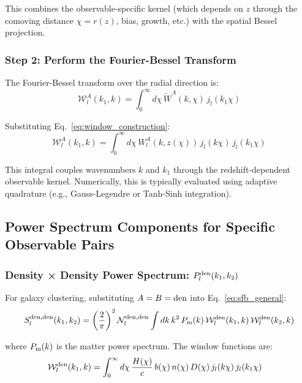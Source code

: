 This combines the observable-specific kernel (which depends on $z$ through the comoving distance $\chi = r(z)$, bias, growth, etc.) with the spatial Bessel projection.

\subsubsection{Step 2: Perform the Fourier-Bessel Transform}

The Fourier-Bessel transform over the radial direction is:
\begin{equation}
\label{eq:fb_transform_integral}
\mathcal{W}_l^A(k_1, k) = \int_0^\infty d\chi \, \widetilde{W}^A(k, \chi) \, j_l(k_1 \chi)
\end{equation}

Substituting Eq.~\ref{eq:window_construction}:
\begin{equation}
\label{eq:fb_transform_explicit}
\mathcal{W}_l^A(k_1, k) = \int_0^\infty d\chi \, W_l^A(k, z(\chi)) \, j_l(k \chi) \, j_l(k_1 \chi)
\end{equation}

This integral couples wavenumbers $k$ and $k_1$ through the redshift-dependent observable kernel. Numerically, this is typically evaluated using adaptive quadrature (e.g., Gauss-Legendre or Tanh-Sinh integration).

\subsection{Power Spectrum Components for Specific Observable Pairs}

\subsubsection{Density × Density Power Spectrum: $P^{\rm den}_l(k_1, k_2)$}

For galaxy clustering, substituting $A = B = \rm den$ into Eq.~\ref{eq:sfb_general}:
\begin{equation}
\label{eq:ps_den_den}
S_l^{\rm den,den}(k_1, k_2) = \left(\frac{2}{\pi}\right)^2 \mathcal{N}_l^{\rm den,den} \int dk \, k^2 \, P_{\rm m}(k) \, \mathcal{W}_l^{\rm den}(k_1, k) \, \mathcal{W}_l^{\rm den}(k_2, k)
\end{equation}

where $P_{\rm m}(k)$ is the matter power spectrum. The window functions are:
\begin{align}
\label{eq:window_den_fb}
\mathcal{W}_l^{\rm den}(k_1, k) &= \int_0^\infty d\chi \, \frac{H(\chi)}{c} \, b(\chi) \, n(\chi) \, D(\chi) \, j_l(k \chi) \, j_l(k_1 \chi)
\end{align}

